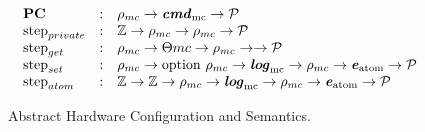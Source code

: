 \begin{figure}
\noindent{}

$$
\begin{array}{llll}
{\mathrm{\textbf{PC}}} & : &  {\rho_{mc}} \rightarrow {\mathrm{\textbf{\textit{cmd}}_{mc}}} \rightarrow {\mathcal{P}}\\
{{\mathrm{step}_{private}}} & : & {\mathbb{Z}} \rightarrow {\rho_{mc}} \rightarrow {\rho_{mc}} \rightarrow {\mathcal{P}} \\
{\mathrm{step}_{get}} & : & {\rho_{mc}} \rightarrow {\Theta{mc}} \rightarrow {\rho_{mc}} \rightarrow  \rightarrow {\mathcal{P}} \\ 
{\mathrm{step}_{set}} & :  & {\rho_{mc}} \rightarrow {\mathrm{option}~{{\rho_{mc}}}} \rightarrow {\mathrm{\textbf{\textit{log}}}_{\mathrm{mc}}} \rightarrow {\rho_{mc}} \rightarrow {\mathrm{\textbf{\textit{e}}}_{\mathrm{atom}}} \rightarrow {\mathcal{P}}\\
{\mathrm{step}_{atom}} & : &  {\mathbb{Z}} \rightarrow {\mathbb{Z}} \rightarrow {\rho_{mc}} \rightarrow {\mathrm{\textbf{\textit{log}}}_{\mathrm{mc}}} \rightarrow {\rho_{mc}} \rightarrow {\mathrm{\textbf{\textit{e}}}_{\mathrm{atom}}} \rightarrow {\mathcal{P}}  \\
\end{array}
$$



\caption{Abstract Hardware Configuration and Semantics.}
\label{fig:chapter:conlinkg:abstract-hardware-configuration-and-semantics}
\end{figure}

